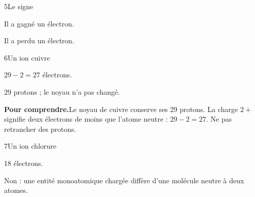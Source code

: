 \par\noindent\begin{minipage}{\linewidth}
\begin{corrige}{5}{Le signe}
\begin{questions}
\item Il a gagné un électron.
\item Il a perdu un électron.
\end{questions}
\end{corrige}
\end{minipage}
\par\noindent\begin{minipage}{\linewidth}
\begin{corrige}{6}{Un ion cuivre}
\begin{questions}
\item $29-2=27$ électrons.
\item 29 protons ; le noyau n’a pas changé.
\end{questions}
\par\smallskip\noindent\textbf{Pour comprendre.}\enspace Le noyau de cuivre conserve ses 29 protons. La charge $2+$ signifie deux électrons de moins que l’atome neutre : $29-2=27$. Ne pas retrancher des protons.\par
{}
\end{corrige}
\end{minipage}
\par\noindent\begin{minipage}{\linewidth}
\begin{corrige}{7}{Un ion chlorure}
\begin{questions}
\item 18 électrons.
\item Non : une entité monoatomique chargée diffère d’une molécule neutre à deux atomes.
\end{questions}
\end{corrige}
\end{minipage}
